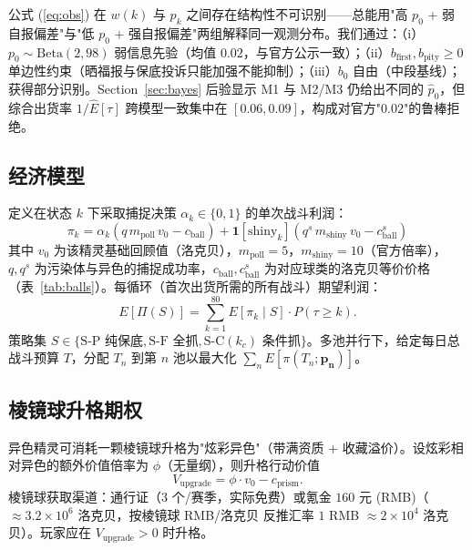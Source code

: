 \documentclass[journal]{IEEEtran}
\begin{document}
公式 (\ref{eq:obs}) 在 $w(k)$ 与 $p_k$ 之间存在结构性不可识别——总能用"高 $p_0$ + 弱自报偏差"与"低 $p_0$ + 强自报偏差"两组解释同一观测分布。我们通过：（i）$p_0 \sim \text{Beta}(2, 98)$ 弱信息先验（均值 $0.02$，与官方公示一致）；（ii）$b_{\text{first}}, b_{\text{pity}} \ge 0$ 单边性约束（晒福报与保底投诉只能加强不能抑制）；（iii）$b_0$ 自由（中段基线）；获得部分识别。Section~\ref{sec:bayes} 后验显示 M1 与 M2/M3 仍给出不同的 $\hat p_0$，但综合出货率 $1/\hat E[\tau]$ 跨模型一致集中在 $[0.06, 0.09]$，构成对官方"$0.02$"的鲁棒拒绝。

\subsection{经济模型}

定义在状态 $k$ 下采取捕捉决策 $\alpha_k \in \{0, 1\}$ 的单次战斗利润：
\begin{equation}
\pi_k = \alpha_k(q\, m_{\text{poll}}\, v_0 - c_{\text{ball}}) + \mathbf{1}[\text{shiny}_k](q^s\, m_{\text{shiny}}\, v_0 - c^s_{\text{ball}})
\label{eq:profit}
\end{equation}
其中 $v_0$ 为该精灵基础回顾值（洛克贝），$m_{\text{poll}} = 5$，$m_{\text{shiny}} = 10$（官方倍率），$q, q^s$ 为污染体与异色的捕捉成功率，$c_{\text{ball}}, c^s_{\text{ball}}$ 为对应球类的洛克贝等价价格（表~\ref{tab:balls}）。每循环（首次出货所需的所有战斗）期望利润：
\begin{equation}
E[\Pi(S)] = \sum_{k=1}^{80} E[\pi_k \mid S]\cdot P(\tau \ge k).
\label{eq:expected_profit}
\end{equation}
策略集 $S \in \{\text{S-P 纯保底}, \text{S-F 全抓}, \text{S-C}(k_c) \text{ 条件抓}\}$。多池并行下，给定每日总战斗预算 $T$，分配 $T_n$ 到第 $n$ 池以最大化 $\sum_n E[\pi(T_n; \mathbf{p_n})]$。

\subsection{棱镜球升格期权}

异色精灵可消耗一颗棱镜球升格为"炫彩异色"（带满资质 + 收藏溢价）。设炫彩相对异色的额外价值倍率为 $\phi$（无量纲），则升格行动价值
\begin{equation}
V_{\text{upgrade}} = \phi \cdot v_0 - c_{\text{prism}}.
\label{eq:option}
\end{equation}
棱镜球获取渠道：通行证（$3$ 个/赛季，实际免费）或氪金 $160$ 元 (RMB)（$\approx 3.2 \times 10^6$ 洛克贝，按棱镜球 RMB/洛克贝 反推汇率 $1$ RMB $\approx 2 \times 10^4$ 洛克贝）。玩家应在 $V_{\text{upgrade}} > 0$ 时升格。
\end{document}
